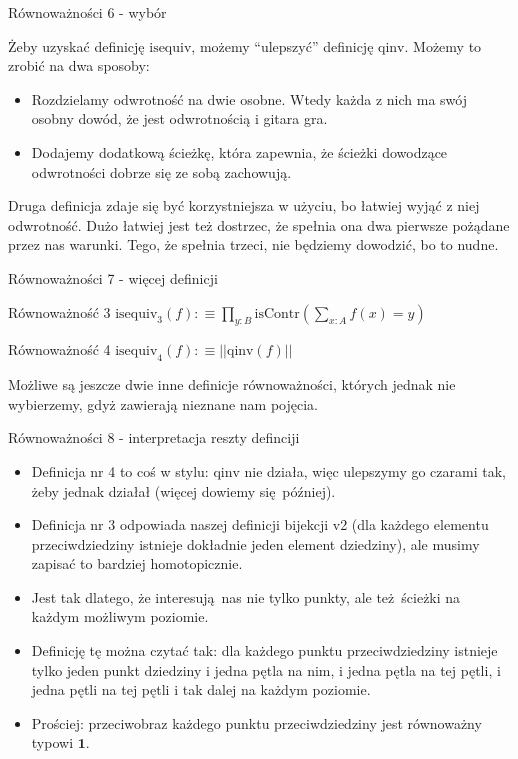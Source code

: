 \documentclass{beamer}
\newcommand{\defn}{:\equiv}
\newcommand{\qinv}{\text{qinv}}
\newcommand{\isequiv}{\text{isequiv}}
\begin{document}
\begin{frame}{Równoważności 6 - wybór}

Żeby uzyskać definicję $\isequiv$, możemy ``ulepszyć'' definicję $\qinv$. Możemy to zrobić na dwa sposoby:

\begin{itemize}
	\item Rozdzielamy odwrotność na dwie osobne. Wtedy każda z nich ma swój osobny dowód, że jest odwrotnością i gitara gra.
	\item Dodajemy dodatkową ścieżkę, która zapewnia, że ścieżki dowodzące odwrotności dobrze się ze sobą zachowują.
\end{itemize}

Druga definicja zdaje się być korzystniejsza w użyciu, bo łatwiej wyjąć z niej odwrotność. Dużo łatwiej jest też dostrzec, że spełnia ona dwa pierwsze pożądane przez nas warunki. Tego, że spełnia trzeci, nie będziemy dowodzić, bo to nudne.

\end{frame}

\begin{frame}{Równoważności 7 - więcej definicji}

\begin{block}{Równoważność 3}
$
\displaystyle
	\isequiv_3(f) \defn
		\prod_{y : B} \text{isContr}\left(\sum_{x : A} f(x) = y\right)
$
\end{block}


\begin{block}{Równoważność 4}
$
\displaystyle
	\isequiv_4(f) \defn ||\qinv(f)||
$
\end{block}

Możliwe są jeszcze dwie inne definicje równoważności, których jednak nie wybierzemy, gdyż zawierają nieznane nam pojęcia.

\end{frame}

\begin{frame}{Równoważności 8 - interpretacja reszty definciji}
\begin{itemize}
	\item Definicja nr 4 to coś w stylu: $\qinv$ nie działa, więc ulepszymy go czarami tak, żeby jednak działał (więcej dowiemy się później).
	\item Definicja nr 3 odpowiada naszej definicji bijekcji v2 (dla każdego elementu przeciwdziedziny istnieje dokładnie jeden element dziedziny), ale musimy zapisać to bardziej homotopicznie.
	\item Jest tak dlatego, że interesują nas nie tylko punkty, ale też ścieżki na każdym możliwym poziomie.
	\item Definicję tę można czytać tak: dla każdego punktu przeciwdziedziny istnieje tylko jeden punkt dziedziny i jedna pętla na nim, i jedna pętla na tej pętli, i jedna pętli na tej pętli i tak dalej na każdym poziomie.
	\item Prościej: przeciwobraz każdego punktu przeciwdziedziny jest równoważny typowi $\textbf{1}$.
\end{itemize}
\end{frame}
\end{document}
